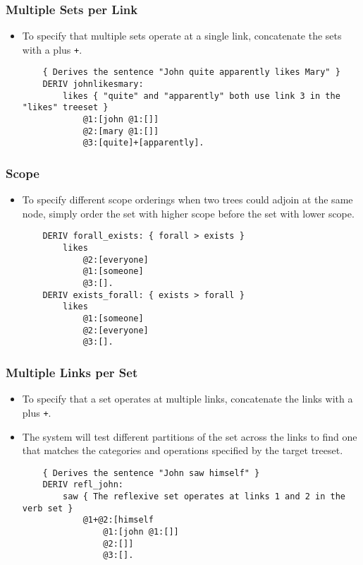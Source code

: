 \documentclass[10.5pt]{article}
\newcommand{\code}[1]{\texttt{#1}}
\begin{document}
\subsubsection{Multiple Sets per Link}
  \begin{itemize}
	\item To specify that multiple sets operate at a single link, concatenate the sets with a plus \code{+}.

	\begin{mdframed}[backgroundcolor=blue!5]
	\begin{verbatim}
	{ Derives the sentence "John quite apparently likes Mary" }
	DERIV johnlikesmary:
	    likes { "quite" and "apparently" both use link 3 in the "likes" treeset }
	        @1:[john @1:[]]
	        @2:[mary @1:[]]
	        @3:[quite]+[apparently].
	\end{verbatim}
	\end{mdframed}
  \end{itemize}

\subsubsection{Scope}
  \begin{itemize}
	\item To specify different scope orderings when two trees could adjoin at the same node,
	  simply order the set with higher scope before the set with lower scope.

	\begin{mdframed}[backgroundcolor=blue!5]
	\begin{verbatim}
	DERIV forall_exists: { forall > exists }
	    likes
	        @2:[everyone]
	        @1:[someone]
	        @3:[].
	DERIV exists_forall: { exists > forall }
	    likes
	        @1:[someone]
	        @2:[everyone]
	        @3:[].
	\end{verbatim}
	\end{mdframed}
  \end{itemize}

\subsubsection{Multiple Links per Set}
  \begin{itemize}
	\item To specify that a set operates at multiple links, concatenate the links with a plus \code{+}.
	\item The system will test different partitions of the set across the links to find one that matches the categories and operations specified by the target treeset.

	\begin{mdframed}[backgroundcolor=blue!5]
	\begin{verbatim}
	{ Derives the sentence "John saw himself" }
	DERIV refl_john:
	    saw { The reflexive set operates at links 1 and 2 in the verb set }
		    @1+@2:[himself
	            @1:[john @1:[]]
	            @2:[]]
	            @3:[].
	\end{verbatim}
	\end{mdframed}
  \end{itemize}
\end{document}
